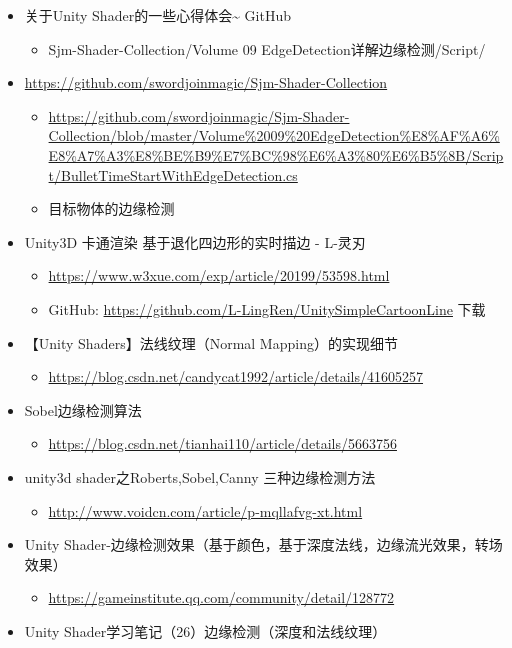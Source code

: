\documentclass[9pt, b5paper]{article}
\begin{document}
\begin{itemize}
\item 关于Unity Shader的一些心得体会\textasciitilde{} GitHub
\begin{itemize}
\item Sjm-Shader-Collection/Volume 09 EdgeDetection详解边缘检测/Script/
\end{itemize}
\item \url{https://github.com/swordjoinmagic/Sjm-Shader-Collection}
\begin{itemize}
\item \url{https://github.com/swordjoinmagic/Sjm-Shader-Collection/blob/master/Volume\%2009\%20EdgeDetection\%E8\%AF\%A6\%E8\%A7\%A3\%E8\%BE\%B9\%E7\%BC\%98\%E6\%A3\%80\%E6\%B5\%8B/Script/BulletTimeStartWithEdgeDetection.cs}
\item 目标物体的边缘检测
\end{itemize}
\item Unity3D 卡通渲染 基于退化四边形的实时描边 - L-灵刃
\begin{itemize}
\item \url{https://www.w3xue.com/exp/article/20199/53598.html}
\item GitHub: \url{https://github.com/L-LingRen/UnitySimpleCartoonLine} 下载
\end{itemize}
\item 【Unity Shaders】法线纹理（Normal Mapping）的实现细节
\begin{itemize}
\item \url{https://blog.csdn.net/candycat1992/article/details/41605257}
\end{itemize}
\item Sobel边缘检测算法
\begin{itemize}
\item \url{https://blog.csdn.net/tianhai110/article/details/5663756}
\end{itemize}
\item unity3d shader之Roberts,Sobel,Canny 三种边缘检测方法
\begin{itemize}
\item \url{http://www.voidcn.com/article/p-mqllafvg-xt.html}
\end{itemize}
\item Unity Shader-边缘检测效果（基于颜色，基于深度法线，边缘流光效果，转场效果）
\begin{itemize}
\item \url{https://gameinstitute.qq.com/community/detail/128772}
\end{itemize}
\item Unity Shader学习笔记（26）边缘检测（深度和法线纹理）

\end{itemize}
\end{document}
